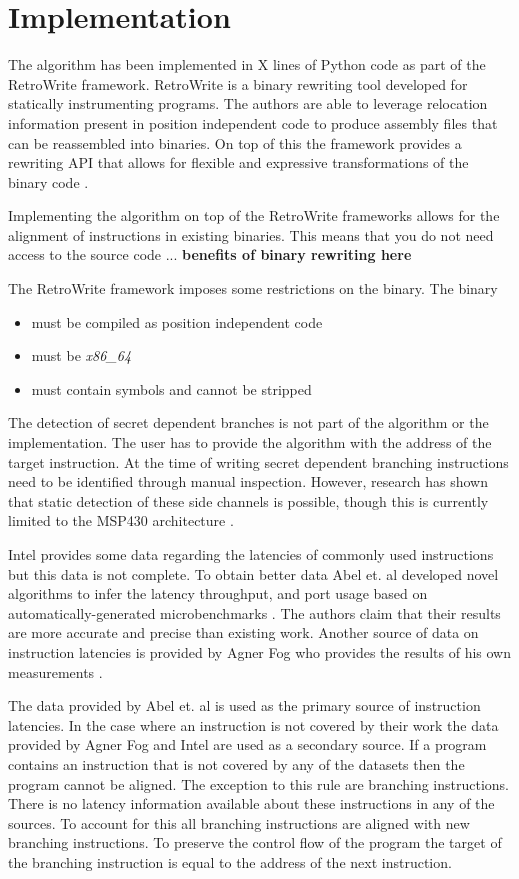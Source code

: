
\chapter{Implementation}

The algorithm has been implemented in X lines of Python code as part of the RetroWrite framework. 
RetroWrite is a binary rewriting tool developed for statically instrumenting programs. 
The authors are able to leverage relocation information present in position independent code to produce assembly files that can be reassembled into binaries.
On top of this the framework provides a rewriting API that allows for flexible and expressive transformations of the binary code \cite{Dinesh2020RetroWriteSI}. 

Implementing the algorithm on top of the RetroWrite frameworks allows for the alignment of instructions in existing binaries. This means that you do not need access to 
the source code ... \textbf{benefits of binary rewriting here}

The RetroWrite framework imposes some restrictions on the binary. The binary 

\begin{itemize}
	\item must be compiled as position independent code 
	\item must be \textit{x86\_64} 
	\item must contain symbols and cannot be stripped
\end{itemize}
\cite{hexhive}

The detection of secret dependent branches is not part of the algorithm or the implementation. The user has to provide the algorithm with the address of the target instruction. 
At the time of writing secret dependent branching instructions need to be identified through manual inspection. However, research has shown that static detection of these side channels is possible, though 
this is currently limited to the MSP430 architecture \cite{MSP430Detection}.

Intel provides some data regarding the latencies of commonly used instructions \cite{intel-ref-manual} but this data is not complete.
To obtain better data Abel et. al developed novel algorithms to infer the latency throughput, and port usage based on automatically-generated microbenchmarks \cite{uops}. 
The authors claim that their results are more accurate and precise than existing work. 
Another source of data on instruction latencies is provided by Agner Fog who provides the results of his own measurements \cite{fog_2021}. 

The data provided by Abel et. al is  used as the primary source of instruction latencies. In the case where an instruction is not covered by their work the data 
provided by Agner Fog and Intel are used as a secondary source. If a program contains an instruction that is not covered by any of the datasets then the program cannot
be aligned. The exception to this rule are branching instructions. There is no latency information available about these instructions in any of the sources. 
To account for this  all branching instructions are aligned with new branching instructions. To preserve the control flow of the program the target of 
the branching instruction is equal to the address of the next instruction. 
